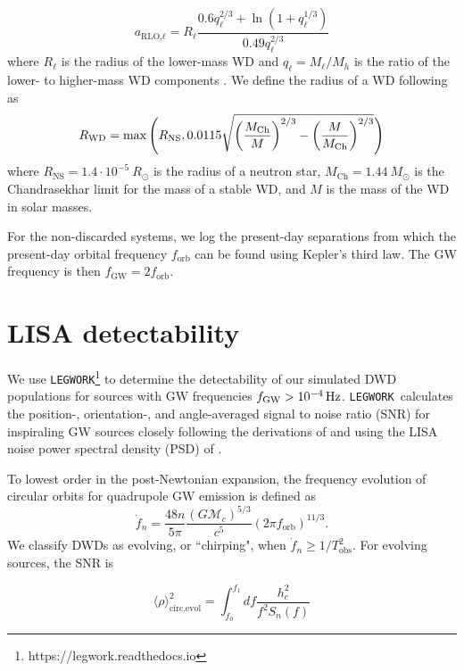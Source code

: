 \documentclass[twocolumn, linenumbers]{aastex631}
\newcommand{\legwork}{\texttt{LEGWORK}}
\begin{document}
\begin{equation}
    a_{\text{RLO,}\ell} = R_{\ell} \frac{0.6 q_{\ell}^{2/3} + \ln{(1+q_{\ell}^{1/3})}}{0.49 q_{\ell}^{2/3}}
\end{equation}
where $R_{\ell}$ is the radius of the lower-mass WD and $q_{\ell} = M_{\ell}/M_{h}$ is the ratio of the lower- to higher-mass WD components \citep{Eggleton1983}. 
We define the radius of a WD following \citet{Tout1997, Hurley2000} as
\begin{equation}
    R_{\rm{WD}} = \max\Bigg(R_\text{NS}, 0.0115\sqrt{\left(\frac{M_\text{Ch}}{M}\right)^{2/3}-\left(\frac{M}{M_\text{Ch}}\right)^{2/3}} \Bigg) 
\end{equation}
\noindent where $R_\text{NS} = 1.4\cdot 10^{-5}~R_\odot$ is the radius of a neutron star, $M_{\text{Ch}}=1.44 ~M_\odot$ is the Chandrasekhar limit for the mass of a stable WD, and $M$ is the mass of the WD in solar masses. 

For the non-discarded systems, we log the present-day separations from which the present-day orbital frequency $f_\text{orb}$ can be found using Kepler's third law. The GW frequency is then $f_\text{GW} = 2f_\text{orb}$.


\section{LISA detectability}
\label{sec:LISA_obs}
We use \legwork\footnote{https://legwork.readthedocs.io} \citep{Wagg2021} to determine the detectability of our simulated DWD populations for sources with GW frequencies $f_{\rm{GW}}>10^{-4}\,\rm{Hz}$. \legwork\ calculates the position-, orientation-, and angle-averaged signal to noise ratio (SNR) for inspiraling GW sources closely following the derivations of \citet{Flanagan1998} and using the LISA noise power spectral density (PSD) of \citet{Robson2019}. 

To lowest order in the post-Newtonian expansion, the frequency evolution of circular orbits for quadrupole GW emission is defined as
\begin{equation}
    \Dot{f}_n = \frac{48n}{5\pi} \frac{(G\mathcal{M}_c)^{5/3}}{c^5} (2\pi f_\text{orb})^{11/3}.
\end{equation}
We classify DWDs as evolving, or ``chirping", when $\Dot{f}_n \geq 1/T_\text{obs}^2$. For evolving sources, the SNR is

\begin{equation}
   \langle \rho \rangle^2_{\text{circ,evol}} = \int_{f_0}^{f_1}df   \frac{h_{c}^2}{f^2S_n(f)}
\end{equation}
\end{document}
